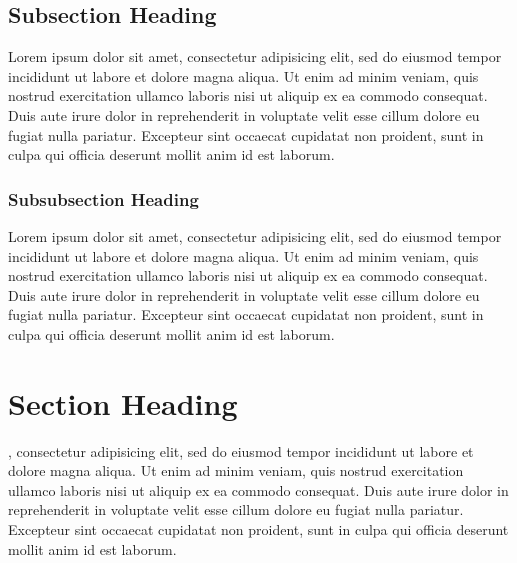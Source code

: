 \subsection{Subsection Heading}
Lorem ipsum dolor sit amet, consectetur adipisicing elit, sed do eiusmod tempor incididunt ut labore et dolore magna aliqua. Ut enim ad minim veniam, quis nostrud exercitation ullamco laboris nisi ut aliquip ex ea commodo consequat. Duis aute irure dolor in reprehenderit in voluptate velit esse cillum dolore eu fugiat nulla pariatur. Excepteur sint occaecat cupidatat non proident, sunt in culpa qui officia deserunt mollit anim id est laborum.

  \subsubsection{Subsubsection Heading}
  Lorem ipsum dolor sit amet, consectetur adipisicing elit, sed do eiusmod tempor incididunt ut labore et dolore magna aliqua. Ut enim ad minim veniam, quis nostrud exercitation ullamco laboris nisi ut aliquip ex ea commodo consequat. Duis aute irure dolor in reprehenderit in voluptate velit esse cillum dolore eu fugiat nulla pariatur. Excepteur sint occaecat cupidatat non proident, sunt in culpa qui officia deserunt mollit anim id est laborum.

\section{Section Heading}
, consectetur adipisicing elit, sed do eiusmod tempor incididunt ut labore et dolore magna aliqua. Ut enim ad minim veniam, quis nostrud exercitation ullamco laboris nisi ut aliquip ex ea commodo consequat. Duis aute irure dolor in reprehenderit in voluptate velit esse cillum dolore eu fugiat nulla pariatur. Excepteur sint occaecat cupidatat non proident, sunt in culpa qui officia deserunt mollit anim id est laborum.